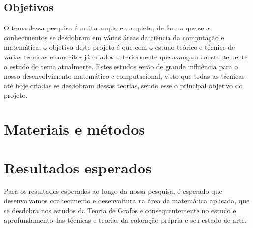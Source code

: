 \documentclass[12pt]{article}
\begin{document}
	\subsection{Objetivos}
	
	O tema dessa pesquisa é muito amplo e completo, de forma que seus conhecimentos se desdobram em várias áreas da ciência da computação e matemática, o objetivo deste projeto é que com o estudo teórico e técnico de várias técnicas e conceitos já criados anteriormente que avançam constantemente o estudo do tema atualmente.
	Estes estudos serão de grande influência para o nosso desenvolvimento matemático e computacional, visto que todas as técnicas até hoje criadas se desdobram dessas teorias, sendo esse o principal objetivo do projeto.
	
	
	\section{Materiais e métodos}
	
	
	
	\section{Resultados esperados}
	Para os resultados esperados ao longo da nossa pesquisa, é esperado que desenvolvamos conhecimento e desenvoltura na área da matemática aplicada, que se desdobra nos estudos da Teoria de Grafos e consequentemente no estudo e aprofundamento das técnicas e teorias da coloração própria e seu estado de arte.
	
	
	
\end{document}

